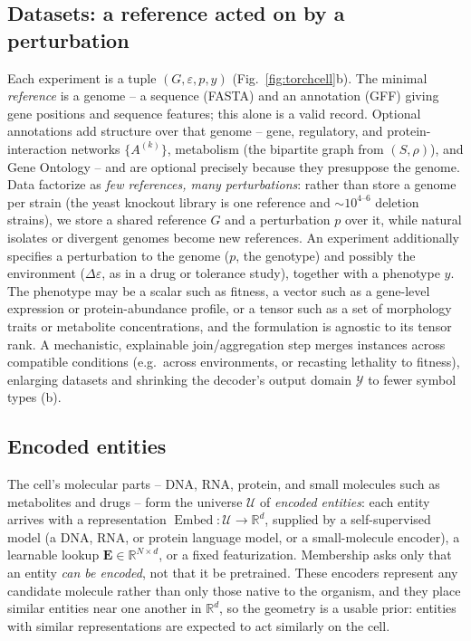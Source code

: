 \subsection*{Datasets: a reference acted on by a perturbation}
Each experiment is a tuple $(G,\varepsilon,p,y)$ (Fig.~\ref{fig:torchcell}b). The minimal
\emph{reference} is a genome -- a sequence (FASTA) and an annotation (GFF) giving gene positions and sequence
features; this alone is a valid record. Optional annotations add structure over that
genome -- gene, regulatory, and protein-interaction networks $\{A^{(k)}\}$, metabolism
(the bipartite graph from $(S,\rho)$), and Gene Ontology -- and are optional precisely
because they presuppose the genome. Data factorize as \emph{few references, many
perturbations}: rather than store a genome per strain (the yeast knockout library is one
reference and ${\sim}10^{4\text{--}6}$ deletion strains), we store a shared reference $G$
and a perturbation $p$ over it, while natural isolates or divergent genomes become new
references. An experiment additionally specifies a perturbation to the genome ($p$, the genotype) and
possibly the environment ($\Delta\varepsilon$, as in a drug or tolerance study), together
with a phenotype $y$. The phenotype may be a scalar such as fitness, a vector such as a
gene-level expression or protein-abundance profile, or a tensor such as a set of morphology
traits or metabolite concentrations, and the formulation is agnostic to its tensor rank. A mechanistic,
explainable join/aggregation step merges instances across compatible conditions (e.g.\
across environments, or recasting lethality to fitness), enlarging datasets and shrinking
the decoder's output domain $\mathcal{Y}$ to fewer symbol types
(b).

\subsection*{Encoded entities}
The cell's molecular parts -- DNA, RNA, protein, and small molecules such as metabolites and
drugs -- form the universe $\mathcal{U}$ of \emph{encoded entities}: each entity arrives with
a representation $\operatorname{Embed}:\mathcal{U}\to\mathbb{R}^{d}$, supplied by a
self-supervised model (a DNA, RNA, or protein language model, or a small-molecule encoder),
a learnable lookup $\mathbf{E}\in\mathbb{R}^{N\times d}$, or a fixed featurization.
Membership asks only that an entity \emph{can be encoded}, not that it be pretrained. These
encoders represent any candidate molecule rather than only those native to the organism, and
they place similar entities near one another in $\mathbb{R}^{d}$, so the geometry is a usable
prior: entities with similar representations are expected to act similarly on the cell.

